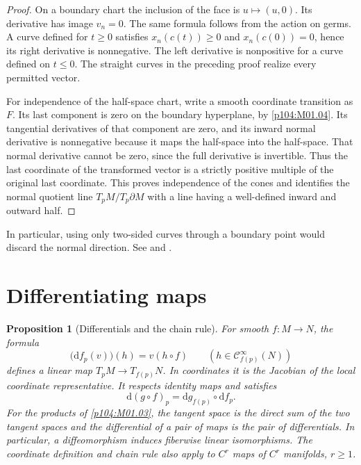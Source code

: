 \documentclass[11pt,oneside,openany]{book}
\newtheorem{proposition}[theorem]{Proposition}
\theoremstyle{definition}
\theoremstyle{remark}
\newcommand{\dd}{\mathrm d}
\begin{document}
\begin{proof}
On a boundary chart the inclusion of the face is
\(u\mapsto(u,0)\). Its derivative has image \(v_n=0\).
The same formula follows from the action on germs. A
curve defined for \(t\geq0\) satisfies \(x_n(c(t))\geq0\)
and \(x_n(c(0))=0\), hence its right derivative is
nonnegative. The left derivative is nonpositive for a
curve defined on \(t\leq0\). The straight curves in the
preceding proof realize every permitted vector.

For independence of the half-space chart, write a smooth
coordinate transition as \(F\). Its last component is zero
on the boundary hyperplane, by \cref{p104:M01.04}.
Its tangential derivatives of that component are zero,
and its inward normal derivative is nonnegative because
it maps the half-space into the half-space. That normal
derivative cannot be zero, since the full derivative is
invertible. Thus the last coordinate of the transformed
vector is a strictly positive multiple of the original
last coordinate. This proves independence of the cones
and identifies the normal quotient line
\(T_pM/T_p\partial M\) with a line having a well-defined
inward and outward half.
\end{proof}

In particular, using only two-sided curves through a boundary
point would discard the normal direction. See
\cite[Proposition~3.23]{lee} and \cite[Section~22.4]{tu}.

\section{Differentiating maps}

\begin{proposition}[Differentials and the chain rule]\label{p104:M02.03}
For smooth \(f:M\to N\), the formula
\[
  \bigl(\dd f_p(v)\bigr)(h)=v(h\circ f)
  \qquad(h\in\mathcal C_{f(p)}^\infty(N))
\]
defines a linear map \(T_pM\to T_{f(p)}N\).
In coordinates it is the Jacobian of the local coordinate
representative. It respects identity maps and satisfies
\[
  \dd(g\circ f)_p=\dd g_{f(p)}\circ\dd f_p .
\]
For the products of \cref{p104:M01.03}, the tangent space is the direct sum of the two
tangent spaces and the differential of a pair of maps is
the pair of differentials. In particular, a diffeomorphism
induces fiberwise linear isomorphisms. The coordinate
definition and chain rule also apply to \(C^r\) maps of
\(C^r\) manifolds, \(r\geq1\).
\end{proposition}
\end{document}
